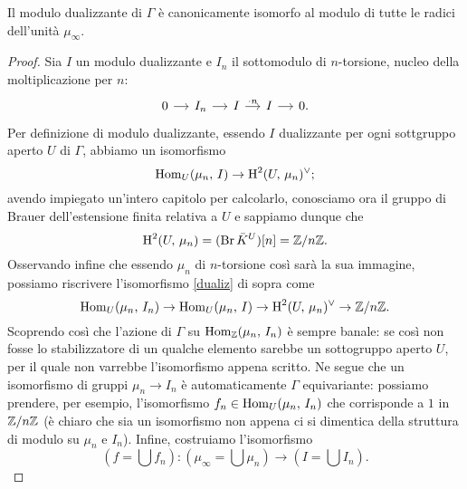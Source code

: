 
\begin{proposition}
	Il modulo dualizzante di $ \Gamma $ è canonicamente isomorfo al modulo di tutte le radici dell'unità $ \mu_\infty $.
\end{proposition}
\begin{proof}
	Sia $ I $ un modulo dualizzante e $ I_n $ il sottomodulo di $ n $-torsione, nucleo della moltiplicazione per $ n $:
	\[ \begin{tikzcd}[column sep = small]
	0 \rar & I_n \rar & I \rar["\cdot n"] & I \rar & 0.
	\end{tikzcd} \]
	Per definizione di modulo dualizzante, essendo $ I $ dualizzante per ogni sottgruppo aperto $ U $ di $ \Gamma $, abbiamo un isomorfismo
	\begin{equation}\label{dualiz}
		 \operatorname{Hom}_U(\mu_n, \, I) \to \operatorname{H}^2(U, \, \mu_n)^\vee;
	\end{equation}
	avendo impiegato un'intero capitolo per calcolarlo, conosciamo ora il gruppo di Brauer dell'estensione finita relativa a $ U $ e sappiamo dunque che $$  \operatorname{H}^2(U, \, \mu_n) = (\operatorname{Br} \bar{K}^U)[n] = \mathbb{Z}/n\mathbb{Z}.  $$
	Osservando infine che essendo $ \mu_n $ di $ n $-torsione così sarà la sua immagine, possiamo riscrivere l'isomorfismo \eqref{dualiz} di sopra come
	\[ \operatorname{Hom}_U(\mu_n, \, I_n) \to \operatorname{Hom}_U(\mu_n, \, I) \to \operatorname{H}^2(U, \, \mu_n)^\vee \to \mathbb{Z}/n\mathbb{Z}. \]
	Scoprendo così che l'azione di $ \Gamma $ su $ \operatorname{Hom}_{\mathbb{Z}}(\mu_n, \, I_n) $ è sempre banale: se così non fosse lo stabilizzatore di un qualche elemento sarebbe un sottogruppo aperto $ U $, per il quale non varrebbe l'isomorfismo appena scritto. Ne segue che un isomorfismo di gruppi $ \mu_n \to I_n $ è automaticamente $ \Gamma $ equivariante: possiamo prendere, per esempio, l'isomorfismo $ f_n \in \operatorname{Hom}_U(\mu_n, \, I_n) $ che corrisponde a $ 1 $ in $ \mathbb{Z}/n\mathbb{Z} $ (è chiaro che sia un isomorfismo non appena ci si dimentica della struttura di modulo su $ \mu_n $ e $ I_n $). Infine, costruiamo l'isomorfismo
	\[ \left(f = \bigcup f_n\right) \colon \left(\mu_\infty = \bigcup \mu_n\right) \to \left(I = \bigcup I_n\right).  \]
	 
\end{proof}


